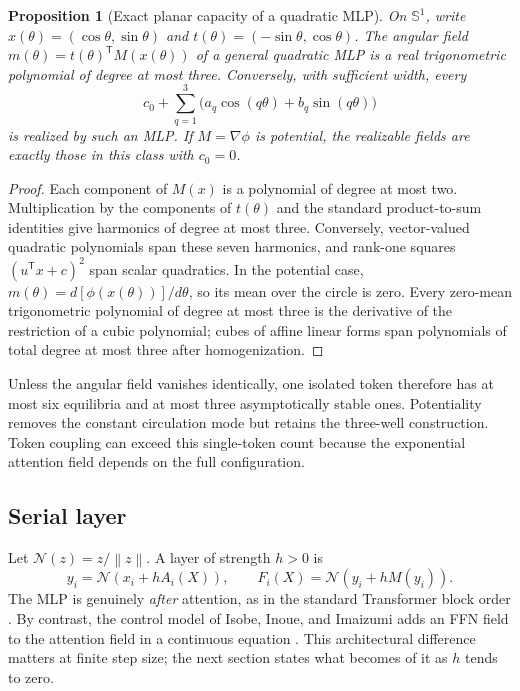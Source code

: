 \documentclass[11pt,a4paper]{article}
\newtheorem{proposition}[theorem]{Proposition}
\theoremstyle{definition}
\newcommand{\sphere}{\mathbb S}
\newcommand{\T}{\mathsf T}
\newcommand{\norm}[1]{\left\lVert #1\right\rVert}
\newcommand{\N}{\mathcal N}
\begin{document}
\begin{proposition}[Exact planar capacity of a quadratic MLP]
\label{prop:planar-mlp-capacity}
On $\sphere^1$, write $x(\theta)=(\cos\theta,\sin\theta)$ and
$t(\theta)=(-\sin\theta,\cos\theta)$.  The angular field
$m(\theta)=t(\theta)^{\T}M(x(\theta))$ of a general quadratic MLP is a real
trigonometric polynomial of degree at most three.  Conversely, with sufficient
width, every
\[
 c_0+\sum_{q=1}^3\bigl(a_q\cos(q\theta)+b_q\sin(q\theta)\bigr)
\]
is realized by such an MLP.  If $M=\nabla\phi$ is potential, the realizable fields
are exactly those in this class with $c_0=0$.
\end{proposition}

\begin{proof}
Each component of $M(x)$ is a polynomial of degree at most two.  Multiplication by
the components of $t(\theta)$ and the standard product-to-sum identities give
harmonics of degree at most three.  Conversely, vector-valued quadratic polynomials
span these seven harmonics, and rank-one squares $(u^{\T}x+c)^2$ span scalar
quadratics.  In the potential case,
$m(\theta)=d[\phi(x(\theta))]/d\theta$, so its mean over the circle is zero.
Every zero-mean trigonometric polynomial of degree at most three is the derivative of
the restriction of a cubic polynomial; cubes of affine linear forms span polynomials
of total degree at most three after homogenization.
\end{proof}

Unless the angular field vanishes identically, one isolated token therefore has at
most six equilibria and at most three asymptotically stable ones.  Potentiality
removes the constant circulation mode but retains the three-well construction.  Token
coupling can exceed this single-token count because the exponential attention field
depends on the full configuration.

\subsection{Serial layer}

Let $\N(z)=z/\norm z$. A layer of strength $h>0$ is
\begin{equation}
 y_i=\N\!\left(x_i+hA_i(X)\right),\qquad
 F_i(X)=\N\!\left(y_i+hM(y_i)\right).\label{eq:serial-layer}
\end{equation}
The MLP is genuinely \emph{after} attention, as in the standard Transformer block
order \cite{vaswani2017attention}. By
contrast, the control model of Isobe, Inoue, and Imaizumi adds an FFN field to the
attention field in a continuous equation \cite{isobe2026training}. This architectural
difference matters at finite step size; the next section states what becomes of it as
$h$ tends to zero.
\end{document}
